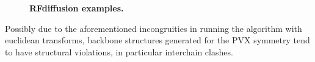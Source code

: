 \begin{figure}
\centering

\caption{\textbf{RFdiffusion examples. }}
\label{fig:rfdiffusion_examples}
\end{figure}

Possibly due to the aforementioned incongruities in running the algorithm with euclidean transforms, backbone structures generated for the PVX symmetry tend to have structural violations, in particular interchain clashes. 
